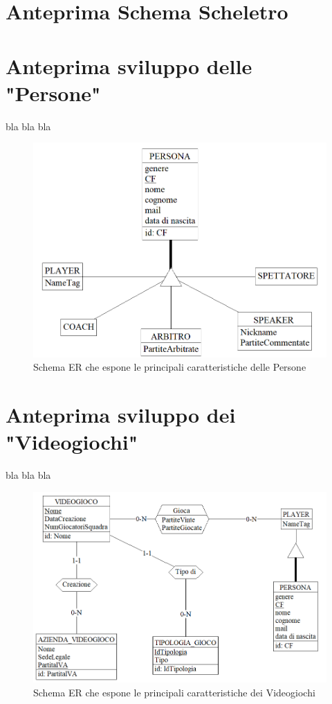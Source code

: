 \documentclass[a4paper,12pt]{report}
\begin{document}
\section{Anteprima Schema Scheletro}
\section{Anteprima sviluppo delle "Persone"}
bla bla bla
\begin{figure}[!htb]
	\centerline{\includegraphics[scale=0.7]{img/ER_Persona.png}}
	\caption{Schema ER che espone le principali caratteristiche delle Persone}
	\label{img:ER_Persona}
\end{figure}
\section{Anteprima sviluppo dei "Videogiochi"}
bla bla bla
\begin{figure}[!htb]
	\centerline{\includegraphics[scale=0.7]{img/ER_Videogiochi.png}}
	\caption{Schema ER che espone le principali caratteristiche dei Videogiochi}
	\label{img:ER_Videogiochi}
\end{figure}
\end{document}
